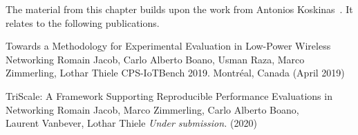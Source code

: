 \pagebreak
\begin{publi}

  The material from this chapter builds upon the work from Antonios Koskinas~\cite{koskinas2019reproducibility}. It relates to the following publications.

  \inlineRef%
  {Towards a Methodology for Experimental Evaluation in Low-Power Wireless Networking}%
  {Romain Jacob, Carlo Alberto Boano, Usman Raza, Marco Zimmerling, Lothar Thiele}%
  {CPS-IoTBench 2019. Montréal, Canada (April 2019)}

  \inlineRef%
  {TriScale: A Framework Supporting Reproducible Performance Evaluations in Networking}%
  {Romain Jacob, Marco Zimmerling, Carlo Alberto Boano,\\
  Laurent Vanbever, Lothar Thiele}%
  {\emph{Under submission.} (2020)}

\end{publi}
